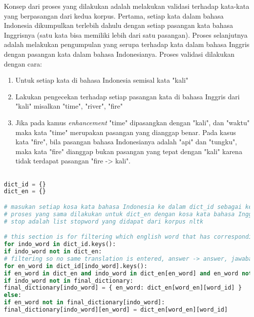 Konsep dari proses yang dilakukan adalah melakukan validasi terhadap kata-kata yang berpasangan  dari kedua korpus. Pertama, setiap kata dalam bahasa Indonesia dikumpulkan terlebih dahulu dengan setiap pasangan kata bahasa Inggrisnya (satu kata bisa memiliki lebih dari satu pasangan). Proses selanjutnya adalah melakukan pengumpulan yang serupa terhadap kata dalam bahasa Inggris dengan pasangan kata dalam bahasa Indonesianya. Proses validasi dilakukan dengan cara:

\begin{enumerate}
	\item Untuk setiap kata di bahasa Indonesia semisal kata "kali"
	\item Lakukan pengecekan terhadap setiap pasangan kata di bahasa Inggris dari "kali" misalkan "time", "river", "fire"
	\item Jika pada kamus \textit{enhancement} "time" dipasangkan dengan "kali", dan "waktu" maka kata "time" merupakan pasangan yang dianggap benar. Pada kasus kata "fire", bila pasangan bahasa Indonesianya adalah "api" dan "tungku", maka kata "fire" dianggap bukan pasangan yang tepat dengan "kali" karena tidak terdapat pasangan "fire -> kali".
\end{enumerate} 

\begin{lstlisting}[language=Python, caption={Word Alignment Enhancement}, label={word-alignment-enhancement}]

dict_id = {}
dict_en = {}

# masukan setiap kosa kata bahasa Indonesia ke dalam dict_id sebagai key dan kumpulan pasangan kata bahasa inggrisnya sebagai value
# proses yang sama dilakukan untuk dict_en dengan kosa kata bahasa Inggris sebagai key dan kumpulan pasangan kata bahasa Indonesia sebagai value
# stop adalah list stopword yang didapat dari korpus nltk

# this section is for filtering which english word that has corresponding indo translation (bidirectional) from Giza output
for indo_word in dict_id.keys():
if indo_word not in dict_en:
# filtering so no same translation is entered, answer -> answer, jawaban -> jawaban
for en_word in dict_id[indo_word].keys():
if en_word in dict_en and indo_word in dict_en[en_word] and en_word not in stop:
if indo_word not in final_dictionary:
final_dictionary[indo_word] = { en_word: dict_en[word_en][word_id] }
else:
if en_word not in final_dictionary[indo_word]:
final_dictionary[indo_word][en_word] = dict_en[word_en][word_id]
\end{lstlisting}

